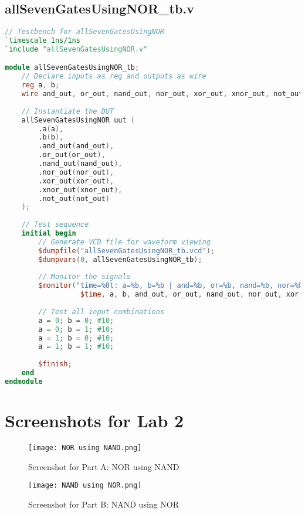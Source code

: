 \documentclass[a4paper,12pt]{article}
\begin{document}
\newpage

\subsection*{allSevenGatesUsingNOR_tb.v}
\begin{lstlisting}[language=Verilog, caption=allSevenGatesUsingNOR_tb.v]
// Testbench for allSevenGatesUsingNOR
`timescale 1ns/1ns
`include "allSevenGatesUsingNOR.v"

module allSevenGatesUsingNOR_tb;
    // Declare inputs as reg and outputs as wire
    reg a, b;
    wire and_out, or_out, nand_out, nor_out, xor_out, xnor_out, not_out;
    
    // Instantiate the DUT
    allSevenGatesUsingNOR uut (
        .a(a),
        .b(b),
        .and_out(and_out),
        .or_out(or_out),
        .nand_out(nand_out),
        .nor_out(nor_out),
        .xor_out(xor_out),
        .xnor_out(xnor_out),
        .not_out(not_out)
    );
    
    // Test sequence
    initial begin
        // Generate VCD file for waveform viewing
        $dumpfile("allSevenGatesUsingNOR_tb.vcd");
        $dumpvars(0, allSevenGatesUsingNOR_tb);
        
        // Monitor the signals
        $monitor("time=%0t: a=%b, b=%b | and=%b, or=%b, nand=%b, nor=%b, xor=%b, xnor=%b, not=%b", 
                  $time, a, b, and_out, or_out, nand_out, nor_out, xor_out, xnor_out, not_out);
                  
        // Test all input combinations
        a = 0; b = 0; #10;
        a = 0; b = 1; #10;
        a = 1; b = 0; #10;
        a = 1; b = 1; #10;
        
        $finish;
    end
endmodule

\end{lstlisting}

\newpage

\section*{Screenshots for Lab 2}

\begin{figure}[h]
    \centering
    \texttt{[image: NOR using NAND.png]} %
    \caption{Screenshot for Part A: NOR using NAND}
\end{figure}

\begin{figure}[h]
    \centering
    \texttt{[image: NAND using NOR.png]} %
    \caption{Screenshot for Part B: NAND using NOR}
\end{figure}
\end{document}
